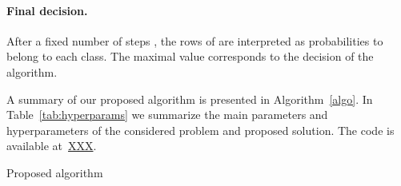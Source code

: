 \documentclass[twoside]{article}
\begin{document}
\paragraph{Final decision.} After a fixed number of steps , the rows of  are interpreted as probabilities to belong to each class. The maximal value corresponds to the decision of the algorithm.

A summary of our proposed algorithm is presented in Algorithm~\ref{algo}. In Table~\ref{tab:hyperparams} we summarize the main parameters and hyperparameters of the considered problem and proposed solution. The code is available at~\url{XXX}.

\begin{algorithm}[h]
\label{algo}
\SetAlgoLined
{}
\caption{Proposed algorithm}
\Parameter{}
\Initialization{}
\RepTimes{}{
    \\
    \\
    \\ 
    \\
}
\Return \end{algorithm}

\begin{table*}[h]
    \caption{Important parameters and hyperparameters.}
    \centering
    \label{tab:hyperparams}
\end{table*}
\end{document}
